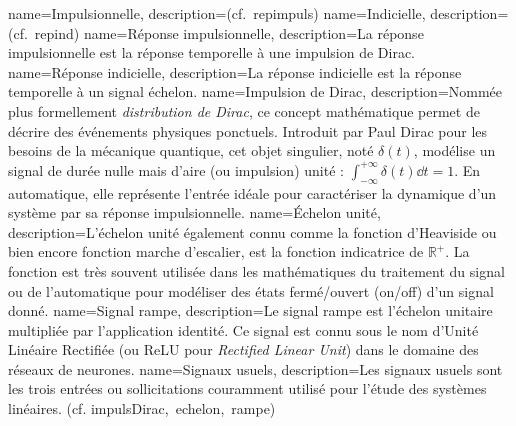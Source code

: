 %
{%
  name={Impulsionnelle},%
  description={(cf.~\gls{repimpuls})}
}
%
{%
  name={Indicielle},%
  description={(cf.~\gls{repind})}
}
%
{%
  name={Réponse impulsionnelle},%
  description={La réponse impulsionnelle est la réponse temporelle
  à une impulsion de Dirac.
  }
}
%
{%
  name={Réponse indicielle},%
  description={La réponse indicielle est la réponse temporelle
  à un signal échelon.
  }
}
%
{%
  name={Impulsion de Dirac},%
  description={Nommée plus formellement \emph{distribution de Dirac}, 
               ce concept mathématique permet de décrire des événements 
               physiques ponctuels. Introduit par Paul Dirac pour les 
               besoins de la mécanique quantique, cet objet singulier, 
               noté $\delta(t)$, modélise un signal de durée nulle mais 
               d'aire (ou impulsion) unité : 
               $\int_{-\infty}^{+\infty} \delta(t) \dd{t} = 1$.
               En automatique, elle représente l'entrée idéale pour 
               caractériser la dynamique d'un système par sa réponse 
               impulsionnelle.}
}
%
{%
  name={Échelon unité},%
  description={L'échelon unité également connu comme 
              la fonction d'Heaviside ou bien encore fonction marche 
              d'escalier, est la fonction indicatrice de $\mathbb{R}^+$.
              La fonction est très souvent utilisée dans les mathématiques 
              du traitement du signal ou de l'automatique pour modéliser 
              des états fermé/ouvert (\og on/off\fg) d'un signal donné.}
}
%
{%
  name={Signal rampe},%
  description={Le signal rampe est l'échelon unitaire multipliée par 
               l'application identité. Ce signal est connu sous le 
               nom d'Unité Linéaire Rectifiée 
               (ou ReLU pour \emph{Rectified Linear Unit}) dans
               le domaine des réseaux de neurones.}
}
%
{%
  name={Signaux usuels},%
  description={Les signaux usuels sont les trois entrées ou sollicitations
              couramment utilisé pour l'étude des systèmes linéaires. 
              (cf. \gls{impulsDirac},~\gls{echelon},~\gls{rampe})}
}
